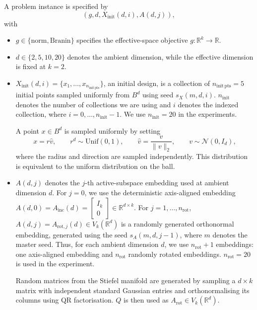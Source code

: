 \documentclass[10pt]{article}
\begin{document}
A problem instance is specified by
\[
    (g,d,X_{\mathrm{init}}(d,i),A(d,j)),
\]
with
\begin{itemize}
    \item $g \in \{\text{norm},\text{Branin}\}$ specifies the effective-space objective $g:\mathbb{R}^k\to\mathbb{R}$.
    
    \item $d \in \{2,5,10,20\}$ denotes the ambient dimension, while the effective dimension is fixed at $k=2$.
    
    \item $X_{\mathrm{init}}(d,i) = \{x_1, \dots, x_{n_{\mathrm{init \,pts}}}\}$, an initial design, is a collection of $n_{\mathrm{init \,pts}}=5$ initial points sampled uniformly from $B^d$ using seed $s_X(m,d,i)$. $n_\mathrm{init}$ denotes the number of collections we are using and $i$ denotes the indexed collection, where $i = 0, \dots, n_\mathrm{init}-1$. We use $n_{\mathrm{init}}=20$ in the experiments.

    A point $x\in B^d$ is sampled uniformly by setting
    \[
        x=r\hat{v},
        \qquad
        r^d\sim\mathrm{Unif}(0,1),
        \qquad
        \hat{v}=\frac{v}{\|v\|_2},
        \qquad
        v\sim\mathcal{N}(0,I_d),
    \]
    where the radius and direction are sampled independently. This distribution is equivalent to the uniform distribution on the ball.
    
    \item 
    $A(d,j)$ denotes the $j$-th active-subspace embedding used at ambient dimension $d$. For $j=0$, we use the deterministic axis-aligned embedding $A(d,0)=A_{\mathrm{inc}}(d)=\begin{bmatrix} I_k \\ 0 \end{bmatrix}\in\mathbb{R}^{d\times k}$. For $j=1,\dots,n_{\mathrm{rot}}$, $A(d,j)=A_{\mathrm{rot},j}(d)\in V_k(\mathbb{R}^d)$ is a randomly generated orthonormal embedding, generated using the seed $s_A(m,d,j-1)$, where $m$ denotes the master seed. Thus, for each ambient dimension $d$, we use $n_{\mathrm{rot}}+1$ embeddings: one axis-aligned embedding and $n_{\mathrm{rot}}$ randomly rotated embeddings. $n_{\mathrm{rot}}=20$ is used in the experiment.

    Random matrices from the Stiefel manifold are generated by sampling a $d\times k$ matrix with independent standard Gaussian entries and orthonormalising its columns using QR factorisation. $Q$ is then used as $A_\mathrm{rot} \in  V_k(\mathbb{R}^d)$.

\end{itemize}
\end{document}
